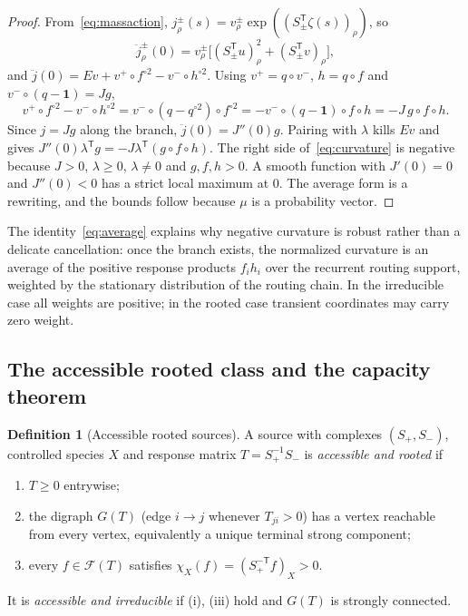 \documentclass[11pt,reqno]{amsart}
\theoremstyle{plain}
\theoremstyle{definition}
\newtheorem{definition}[theorem]{Definition}
\theoremstyle{remark}
\numberwithin{equation}{section}
\newcommand{\one}{\mathbf{1}}
\newcommand{\Sp}{S_{+}}
\newcommand{\Sm}{S_{-}}
\newcommand{\T}{\mathsf{T}}
\newcommand{\cone}{\mathcal{F}}
\renewcommand{\odot}{\circ}
\begin{document}
\begin{proof}
From~\eqref{eq:massaction}, $j^\pm_\rho(s)=v^\pm_\rho\exp((S_\pm^{\T}\zeta(s))_\rho)$, so
\[
\ddot j^\pm_\rho(0)=v^\pm_\rho\big[(S_\pm^{\T}u)_\rho^2+(S_\pm^{\T}v)_\rho\big],
\]
and $\ddot j(0)=Ev+v^+\odot f^{\odot2}-v^-\odot h^{\odot2}$.  Using $v^+=q\odot v^-$, $h=q\odot f$ and $v^-\odot(q-\one)=Jg$,
\[
v^+\odot f^{\odot2}-v^-\odot h^{\odot2}=v^-\odot(q-q^{\odot2})\odot f^{\odot2}=-v^-\odot(q-\one)\odot f\odot h=-J\,g\odot f\odot h .
\]
Since $j=Jg$ along the branch, $\ddot j(0)=J''(0)g$.  Pairing with $\lambda$ kills $Ev$ and gives $J''(0)\lambda^{\T}g=-J\lambda^{\T}(g\odot f\odot h)$.  The right side of~\eqref{eq:curvature} is negative because $J>0$, $\lambda\ge0$, $\lambda\neq0$ and $g,f,h>0$.  A smooth function with $J'(0)=0$ and $J''(0)<0$ has a strict local maximum at $0$.  The average form is a rewriting, and the bounds follow because $\mu$ is a probability vector.
\end{proof}

The identity~\eqref{eq:average} explains why negative curvature is robust rather than a delicate cancellation: once the branch exists, the normalized curvature is an average of the positive response products $f_ih_i$ over the recurrent routing support, weighted by the stationary distribution of the routing chain.  In the irreducible case all weights are positive; in the rooted case transient coordinates may carry zero weight.

\subsection{The accessible rooted class and the capacity theorem}
\begin{definition}[Accessible rooted sources]\label{def:class}
A source with complexes $(\Sp,\Sm)$, controlled species $X$ and response matrix $T=\Sp^{-1}\Sm$ is \emph{accessible and rooted} if
\begin{enumerate}[label=(\roman*)]
\item $T\ge0$ entrywise;
\item the digraph $G(T)$ (edge $i\to j$ whenever $T_{ji}>0$) has a vertex reachable from every vertex, equivalently a unique terminal strong component;
\item every $f\in\cone(T)$ satisfies $\chi_X(f)=(\Sp^{-\T}f)_X>0$.
\end{enumerate}
It is \emph{accessible and irreducible} if (i), (iii) hold and $G(T)$ is strongly connected.
\end{definition}
\end{document}
